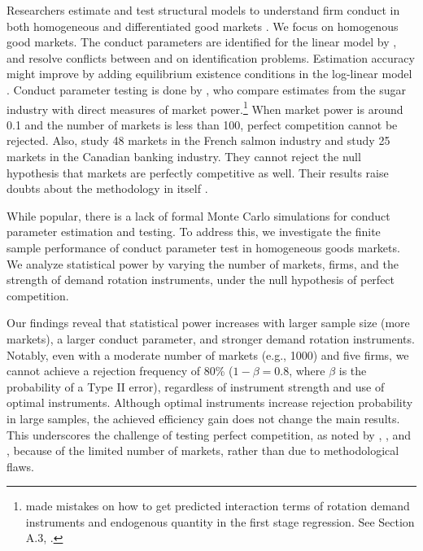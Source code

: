 \documentclass[11pt, a4paper]{article}
\begin{document}
Researchers estimate and test structural models to understand firm conduct in both homogeneous and differentiated good markets \citep{nevoIdentificationOligopolySolution1998, magnolfi2022comparison, duarte2023testing}. 
We focus on homogenous good markets. 
The conduct parameters are identified for the linear model by \citet{bresnahan1982oligopoly}, and \cite{matsumura2023resolving} resolve conflicts between \cite{bresnahan1982oligopoly} and \cite{perloff2012collinearity} on identification problems. 
Estimation accuracy might improve by adding equilibrium existence conditions in the log-linear model \citep{matsumura2023mpec}. 
Conduct parameter testing is done by \cite{genesove1998testing}, who compare estimates from the sugar industry with direct measures of market power.\footnote{\cite{genesove1998testing} made mistakes on how to get predicted interaction terms of rotation demand instruments and endogenous quantity in the first stage regression. See Section A.3, \cite{matsumura2023resolving}.} 
When market power is around 0.1 and the number of markets is less than 100, perfect competition cannot be rejected. 
Also, \cite{steen1999testing} study 48 markets in the French salmon industry and \cite{shaffer1993test} study 25 markets in the Canadian banking industry. 
They cannot reject the null hypothesis that markets are perfectly competitive as well. 
Their results raise doubts about the methodology in itself \citep{shafferMarketPowerCompetition2017}.


While popular, there is a lack of formal Monte Carlo simulations for conduct parameter estimation and testing. 
To address this, we investigate the finite sample performance of conduct parameter test in homogeneous goods markets. 
We analyze statistical power by varying the number of markets, firms, and the strength of demand rotation instruments, under the null hypothesis of perfect competition.

Our findings reveal that statistical power increases with larger sample size (more markets), a larger conduct parameter, and stronger demand rotation instruments. 
Notably, even with a moderate number of markets (e.g., 1000) and five firms, we cannot achieve a rejection frequency of 80\% ($1-\beta=0.8$, where $\beta$ is the probability of a Type II error), regardless of instrument strength and use of optimal instruments. 
Although optimal instruments increase rejection probability in large samples, the achieved efficiency gain does not change the main results.
This underscores the challenge of testing perfect competition, as noted by \cite{genesove1998testing}, \cite{steen1999testing}, and \cite{shaffer1993test}, because of the limited number of markets, rather than due to methodological flaws.
\end{document}
